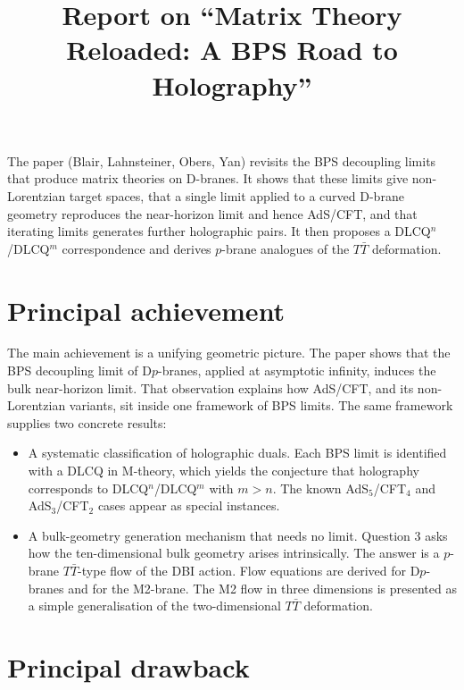 \documentclass[11pt]{article}
\title{Report on ``Matrix Theory Reloaded: A BPS Road to Holography''}
\author{}
\date{}
\begin{document}
\maketitle

The paper (Blair, Lahnsteiner, Obers, Yan) revisits the BPS decoupling limits that produce matrix theories on D-branes. It shows that these limits give non-Lorentzian target spaces, that a single limit applied to a curved D-brane geometry reproduces the near-horizon limit and hence AdS/CFT, and that iterating limits generates further holographic pairs. It then proposes a DLCQ$^n$/DLCQ$^m$ correspondence and derives $p$-brane analogues of the $T\bar T$ deformation.

\section{Principal achievement}

The main achievement is a unifying geometric picture. The paper shows that the BPS decoupling limit of D$p$-branes, applied at asymptotic infinity, induces the bulk near-horizon limit. That observation explains how AdS/CFT, and its non-Lorentzian variants, sit inside one framework of BPS limits. The same framework supplies two concrete results:
\begin{itemize}[leftmargin=*]
\item A systematic classification of holographic duals. Each BPS limit is identified with a DLCQ in M-theory, which yields the conjecture that holography corresponds to DLCQ$^n$/DLCQ$^m$ with $m>n$. The known AdS$_5$/CFT$_4$ and AdS$_3$/CFT$_2$ cases appear as special instances.
\item A bulk-geometry generation mechanism that needs no limit. Question 3 asks how the ten-dimensional bulk geometry arises intrinsically. The answer is a $p$-brane $T\bar T$-type flow of the DBI action. Flow equations are derived for D$p$-branes and for the M2-brane. The M2 flow in three dimensions is presented as a simple generalisation of the two-dimensional $T\bar T$ deformation.
\end{itemize}

\section{Principal drawback}
\end{document}
